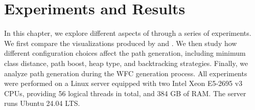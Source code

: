\documentclass[../../main.tex]{subfiles}
\begin{document}
\chapter{Experiments and Results}
\label{chap:application}

In this chapter, we explore different aspects of \wassis through a series of experiments. We first compare the visualizations produced by \wassis and \plantuml. We then study how different configuration choices affect the path generation, including minimum class distance, path boost, heap type, and backtracking strategies. Finally, we analyze path generation during the WFC generation process. All experiments were performed on a Linux server equipped with two Intel Xeon E5-2695 v3 CPUs, providing 56 logical threads in total, and 384 GB of RAM. The server runs Ubuntu 24.04 LTS.


















\end{document}
